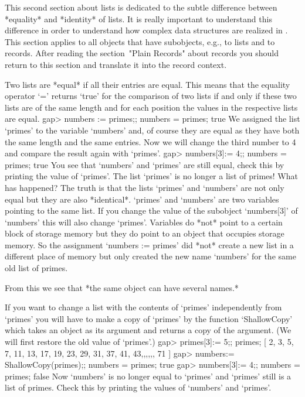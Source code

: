 
%
This second  section  about lists is dedicated  to  the subtle difference
between  *equality*  and *identity*  of lists. It is really important to
understand   this  difference in  order   to  understand how complex data
structures are  realized in {\GAP}.   This section applies  to all {\GAP}
objects  that have  subobjects,  e.g.,  to lists   and to  records. After
reading the section~"Plain Records" about records you should return to
this section and translate it into the record context.

Two  lists are *equal* if all their entries are equal.  This means that the
equality operator `=' returns `true' for the  comparison of  two lists if
and  only if these two lists are of the same length and for each position
the values in the respective lists are equal.
\beginexample
gap> numbers := primes;; numbers = primes;
true 
\endexample
We assigned  the  list `primes' to the variable  `numbers' and, of course
they are equal as they have  both  the same length  and the same entries.
Now we  will change the  third number to  4 and  compare the result again
with `primes'.
\beginexample
gap> numbers[3]:= 4;; numbers = primes;
true 
\endexample
You  see that  `numbers' and  `primes'  are still   equal, check this  by
printing the value of `primes'. The list `primes' is  no longer a list of
primes! What has  happened?  The truth is  that  the  lists  `primes' and
`numbers' are  not only equal but they are also *identical*. `primes' and
`numbers' are two variables pointing to the  same list. If you change the
value of  the subobject `numbers[3]'  of `numbers' this will  also change
`primes'.  Variables do *not* point to  a certain block of storage memory
but they do  point  to an object that  occupies  storage memory.   So the
assignment `numbers := primes' did *not* create a new list in a different
place of memory but only created the new name `numbers'  for the same old
list of primes.

From this we see that *the same object can have several names.*

If you want to change a list with the  contents of `primes' independently
from `primes'  you will have to  make a copy of  `primes' by the function
`ShallowCopy' which takes an object as its argument and returns a copy of
the argument. (We will first restore the old value of `primes'.)
\beginexample
gap> primes[3]:= 5;; primes;
[ 2, 3, 5, 7, 11, 13, 17, 19, 23, 29, 31, 37, 41, 43,,,,,, 71 ]
gap> numbers:= ShallowCopy(primes);; numbers = primes;
true
gap> numbers[3]:= 4;; numbers = primes;
false 
\endexample
Now `numbers' is no longer equal to `primes' and `primes' still is a list
of primes.  Check this by printing the values of `numbers' and `primes'.

